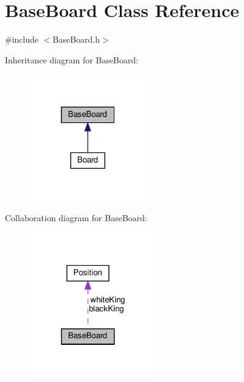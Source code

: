 \hypertarget{class_base_board}{}\section{Base\+Board Class Reference}
\label{class_base_board}


{\ttfamily \#include $<$Base\+Board.\+h$>$}



Inheritance diagram for Base\+Board\+:\nopagebreak
\begin{figure}[H]
\begin{center}
\leavevmode
\includegraphics[width=145pt]{class_base_board__inherit__graph}
\end{center}
\end{figure}


Collaboration diagram for Base\+Board\+:\nopagebreak
\begin{figure}[H]
\begin{center}
\leavevmode
\includegraphics[width=159pt]{class_base_board__coll__graph}
\end{center}
\end{figure}
